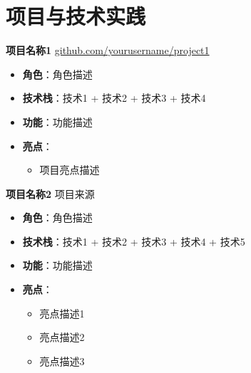 \documentclass[11pt]{article}
\newlength{\iconwidth}
\begin{document}
    \begin{minipage}[t]{\textwidth}
    \section[项目与技术实践]{\makebox[\iconwidth][c]{\color{primary_color}{\faCode}}\quad 项目与技术实践}

    {\large \textbf{项目名称1}} \hfill \href{https://github.com/yourusername/project1}{github.com/yourusername/project1}

    \begin{itemize}
        \item \textbf{角色}：角色描述
        \item \textbf{技术栈}：技术1 + 技术2 + 技术3 + 技术4
        \item \textbf{功能}：功能描述
        \item \textbf{亮点}：
        \begin{itemize}
            \item 项目亮点描述
        \end{itemize}
    \end{itemize}

    \vspace{0.5em}

    {\large \textbf{项目名称2}} \hfill 项目来源
    \begin{itemize}
        \item \textbf{角色}：角色描述
        \item \textbf{技术栈}：技术1 + 技术2 + 技术3 + 技术4 + 技术5
        \item \textbf{功能}：功能描述
        \item \textbf{亮点}：
        \begin{itemize}
            \item 亮点描述1
            \item 亮点描述2
            \item 亮点描述3
        \end{itemize}
    \end{itemize}

    \vspace{0.5em}
    \end{minipage}
\end{document}

